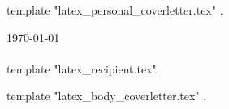 \documentclass[12pt]{article}
\begin{document}

{{ template "latex_personal_coverletter.tex" . }}

\today\\
\hfill\\

{{ template "latex_recipient.tex" . }}

{{ template "latex_body_coverletter.tex" . }}
\end{document}

